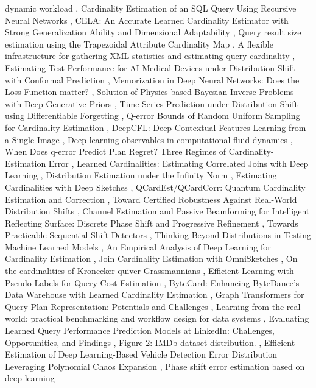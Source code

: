 \documentclass{article}
\begin{document}
dynamic workload \cite{ding2024cardinality2ff06733}, Cardinality Estimation of an SQL Query Using Recursive Neural Networks \cite{karamyan2020cardinalityb36188a7}, CELA: An Accurate Learned Cardinality Estimator with Strong Generalization Ability and Dimensional Adaptability \cite{zhou2021cela804e6ab3}, Query result size estimation using the Trapezoidal Attribute Cardinality Map \cite{oommenndqueryc77dfc5d}, A flexible infrastructure for gathering XML statistics and estimating query cardinality \cite{freirendflexible4ea3aa40}, Estimating Test Performance for AI Medical Devices under Distribution Shift with Conformal Prediction \cite{lu2022estimating56f9b8b3}, Memorization in Deep Neural Networks: Does the Loss Function matter? \cite{patel2021memorizationd8461e31}, Solution of Physics-based Bayesian Inverse Problems with Deep Generative Priors \cite{patel2021solution1a2b4867}, Time Series Prediction under Distribution Shift using Differentiable Forgetting \cite{bennett2022time264d6c74}, Q-error Bounds of Random Uniform Sampling for Cardinality Estimation \cite{li2021qerror328dd440}, DeepCFL: Deep Contextual Features Learning from a Single Image \cite{mastan2020deepcfl3bf82d7f}, Deep learning observables in computational fluid dynamics \cite{lye2019deepa6a318be}, When Does q-error Predict Plan Regret? Three Regimes of Cardinality-Estimation Error \cite{mandarapu2026whend945ce26}, Learned Cardinalities: Estimating Correlated Joins with Deep Learning \cite{kipf2018learned584c9b38}, Distribution Estimation under the Infinity Norm \cite{kontorovich2024distribution2159c6c0}, Estimating Cardinalities with Deep Sketches \cite{kipf2019estimating052330ea}, QCardEst/QCardCorr: Quantum Cardinality Estimation and Correction \cite{winker2025qcardest54b08d83}, Toward Certified Robustness Against Real-World Distribution Shifts \cite{wu2022toward074d63df}, Channel Estimation and Passive Beamforming for Intelligent Reflecting Surface: Discrete Phase Shift and Progressive Refinement \cite{you2019channelabfe122f}, Towards Practicable Sequential Shift Detectors \cite{cobb2023towardsadef1fa4}, Thinking Beyond Distributions in Testing Machine Learned Models \cite{rostamzadeh2021thinking464703b7}, An Empirical Analysis of Deep Learning for Cardinality Estimation \cite{ortiz2019empiricalb76e9a38}, Join Cardinality Estimation with OmniSketches \cite{justen2025join1fa14a35}, On the cardinalities of Kronecker quiver Grassmannians \cite{sznt2009cardinalities97a08e96}, Efficient Learning with Pseudo Labels for Query Cost Estimation \cite{liu2022efficientd26275a3}, ByteCard: Enhancing ByteDance's Data Warehouse with Learned Cardinality Estimation \cite{han2024bytecard9bf5be2d}, Graph Transformers for Query Plan Representation: Potentials and Challenges \cite{lyu2025graphf4ffe599}, Learning from the real world: practical benchmarking and workflow design for data systems \cite{qundlearning658e0998}, Evaluating Learned Query Performance Prediction Models at LinkedIn: Challenges, Opportunities, and Findings \cite{chujun2025evaluating562ee057}, Figure 2: IMDb dataset distribution. \cite{paperndfigure96db3d58}, Efficient Estimation of Deep Learning-Based Vehicle Detection Error Distribution Leveraging Polynomial Chaos Expansion \cite{wang2025efficientd0699fd5}, Phase shift error estimation based on deep learning 
\end{document}
